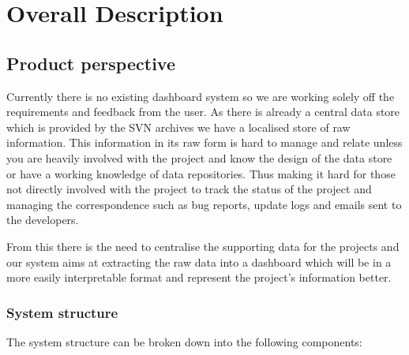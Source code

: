 
\chapter{Overall Description} %

\label{Part7Chapter2} %






\section{Product perspective}

Currently there is no existing dashboard system so we are working solely off the requirements and feedback from the user. As there is already a central data store which is provided by the SVN archives we have a localised store of raw information. This information in its raw form is hard to manage and relate unless you are heavily involved with the project and know the design of the data store or have a working knowledge of data repositories. Thus making it hard for those not directly involved with the project to track the status of the project and managing the correspondence such as bug reports, update logs and emails sent to the developers.

From this there is the need to centralise the supporting data for the projects and our system aims at extracting the raw data into a dashboard which will be in a more easily interpretable format and represent the project’s information better.

\subsection{System structure}

	The system structure can be broken down into the following components:

